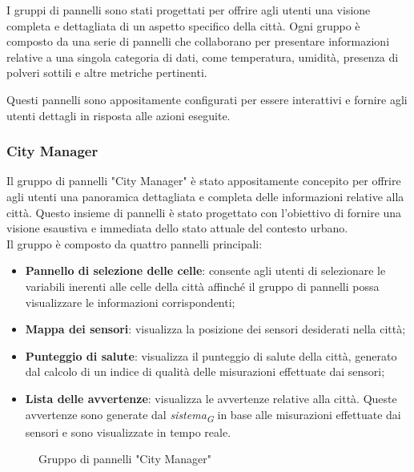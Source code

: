 I gruppi di pannelli sono stati progettati per offrire agli utenti una visione completa e dettagliata di un aspetto specifico della città. Ogni gruppo è composto da una serie di pannelli che collaborano per presentare informazioni relative a una singola categoria di dati, come temperatura, umidità, presenza di polveri sottili e altre metriche pertinenti. 

Questi pannelli sono appositamente configurati per essere interattivi e fornire agli utenti dettagli in risposta alle azioni eseguite.
 \\
\subsubsection{City Manager}
Il gruppo di pannelli "City Manager" è stato appositamente concepito per offrire agli utenti una panoramica dettagliata e completa delle informazioni relative alla città. Questo insieme di pannelli è stato progettato con l'obiettivo di fornire una visione esaustiva e immediata dello stato attuale del contesto urbano. \\
Il gruppo è composto da quattro pannelli principali:
\begin{itemize}
    \item \textbf{Pannello di selezione delle celle}: consente agli utenti di selezionare le variabili inerenti alle celle della città affinché il gruppo di pannelli possa visualizzare le informazioni corrispondenti;
    \item \textbf{Mappa dei sensori}: visualizza la posizione dei sensori desiderati nella città;
    \item \textbf{Punteggio di salute}: visualizza il punteggio di salute della città, generato dal calcolo di un indice di qualità delle misurazioni effettuate dai sensori;
    \item \textbf{Lista delle avvertenze}: visualizza le avvertenze relative alla città. Queste avvertenze sono generate dal \textit{sistema}\textsubscript{\textit{G}} in base alle misurazioni effettuate dai sensori e sono visualizzate in tempo reale.
\end{itemize}
\begin{figure}[H]
    \centering
    \caption{Gruppo di pannelli "City Manager"}
    \label{fig:my_label}
\end{figure} 



